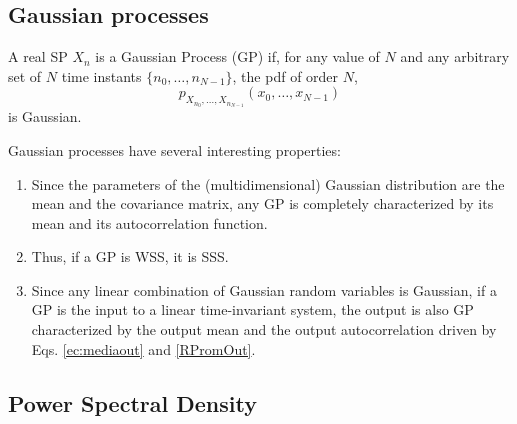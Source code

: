 \subsection{Gaussian processes}
\label{sec:snr}

\begin{definition}
A real SP $X_n$ is a Gaussian Process (GP) if, for any value of $N$ and any arbitrary set of $N$ time instants $\{n_0,\ldots, n_{N-1}\}$, the pdf of order $N$, 
\begin{equation}
p_{X_{n_0},\ldots, X_{n_ {N-1}}} (x_0,\ldots,x_{N-1})
\end{equation}
is Gaussian.
\end{definition}

Gaussian processes have several interesting properties:
\begin{enumerate}
\item Since the parameters of the (multidimensional) Gaussian distribution are the mean and the covariance matrix, any GP is completely characterized by its mean and its autocorrelation function.
\item Thus, if a GP is WSS, it is SSS.
\item Since any linear combination of Gaussian random variables is Gaussian, if a GP is the input to a linear time-invariant system, the output is also GP characterized by the output mean and the output autocorrelation driven by Eqs. \eqref{ec:mediaout} and \eqref{RPromOut}.
\end{enumerate}

%

\subsection{Power Spectral Density}
\label{sec:PowerSpectralDensity}

